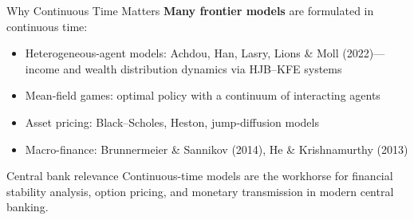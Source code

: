 \documentclass[aspectratio=169,11pt]{beamer}
\newcommand{\emphc}[1]{\textcolor{harvardcrimson}{#1}}
\begin{document}
\begin{frame}{Why Continuous Time Matters}
\textbf{Many frontier models} are formulated in continuous time:

\vspace{0.3em}
\begin{itemize}
    \item \emphc{Heterogeneous-agent models:} Achdou, Han, Lasry, Lions \& Moll (2022)---income and wealth distribution dynamics via HJB--KFE systems

    \vspace{0.2em}
    \item \emphc{Mean-field games:} optimal policy with a continuum of interacting agents

    \vspace{0.2em}
    \item \emphc{Asset pricing:} Black--Scholes, Heston, jump-diffusion models

    \vspace{0.2em}
    \item \emphc{Macro-finance:} Brunnermeier \& Sannikov (2014), He \& Krishnamurthy (2013)
\end{itemize}

\vspace{0.5em}
\begin{block}{Central bank relevance}
Continuous-time models are the workhorse for \emphc{financial stability analysis}, \emphc{option pricing}, and \emphc{monetary transmission} in modern central banking.
\end{block}
\end{frame}
\end{document}
